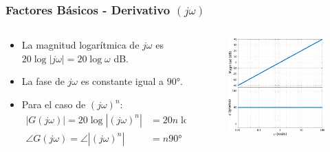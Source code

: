 \documentclass[aspectratio=169]{beamer}
\theoremstyle{definition}
\theoremstyle{plain}
\theoremstyle{remark}
\begin{document}
\begin{frame}[<+->]\frametitle{Factores Básicos - Derivativo $(j\omega)$}
\begin{columns}
	\begin{column}{0.5\textwidth}
	\begin{itemize}
		\item La magnitud logarítmica de $j\omega$ es $20\log\left| j\omega \right| = 20 \log \omega$ dB.
		\item La fase de $j\omega$ es constante igual a $\ang{90}$.
		\item Para el caso de $(j\omega)^n$:
		\begin{align*}
		  \left| G(j\omega) \right| = 20 \log \left| (j\omega)^n \right| &= 20n\log\omega \text{ dB}\\
			\angle G(j\omega) = \angle \left| (j\omega)^n \right| &= n\ang{90}
		\end{align*}
	\end{itemize}
	\end{column}
	\begin{column}{0.5\textwidth}
		\begin{figure}
			\includegraphics[width=6.5cm]{images/bodeDerivative.eps}
		\end{figure}
	\end{column}
\end{columns}
\end{frame}
\end{document}
